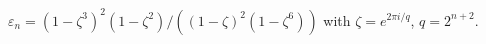 $\varepsilon_n=(1-\zeta^3)^2(1-\zeta^2)/((1-\zeta)^2(1-\zeta^6))$ with $\zeta=e^{2\pi i/q}$, $q=2^{n+2}$.
